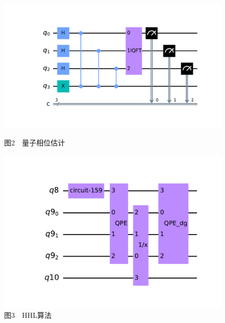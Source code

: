 \documentclass{beamer}
\begin{document}
\begin{spacing}{1.2}
{\begin{frame}
\begin{figure}
        	\begin{minipage}{0.45\textwidth}
        		\centering
        		\vspace{-0.3cm}
        		\includegraphics[width=\textwidth]{qpe.pdf}
        		\caption{图2~~量子相位估计}
        	\end{minipage}\hspace{0.02\textwidth}
        	\begin{minipage}{0.35\textwidth}
        		\centering
        		\vspace{-0.3cm}
        		\includegraphics[width=\textwidth]{HHL.pdf}
        		\caption{图3~~HHL算法}
        	\end{minipage}
        \end{figure}
    \end{frame}

}
\end{spacing}
\end{document}
